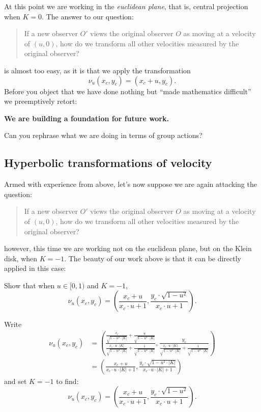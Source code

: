 \documentclass[12pt,noauthor,nooutcomes,handout,newpage]{ximera}
\begin{document}
At this point we are working in the \textit{euclidean plane}, that is,
central projection when $K=0$.
The answer to our question:
\begin{quote}
  If a new observer $O'$ views the original observer $O$ as moving at
  a velocity of $(u,0)$, how do we transform all other velocities
  measured by the original observer?
\end{quote}
is almost too easy, as it is that we apply the transformation
\[
\nu_u(x_c,y_c) = (x_c+u,y_c).
\]
Before you object that we have done nothing but ``made mathematics
difficult'' we preemptively retort:
\begin{center}
  \textbf{We are building a foundation for future work.}
\end{center}

\begin{problem}
  Can you rephrase what we are doing in terms of group actions?
\end{problem}




\subsection{Hyperbolic transformations of velocity}

Armed with experience from above, let's now suppose we are again attacking the question:
\begin{quote}
  If a new observer $O'$ views the original observer $O$ as moving at
  a velocity of $(u,0)$, how do we transform all other velocities
  measured by the original observer?
\end{quote}
however, this time we are working not on the euclidean plane, but on
the Klein disk, when $K=-1$. The beauty of our work above is that it
can be directly applied in this case:

\begin{problem}
  Show that when $u\in [0,1)$ and $K=-1$,
  \[
  \nu_u(x_c,y_c) = \left(\frac{x_c + u}{x_c\cdot u + 1},\frac{y_c\cdot \sqrt{1-u^2}}{x_c\cdot u+1}\right).
  \]
  \begin{freeResponse}
    Write
    \begin{align*}
    \nu_u(x_c,y_c)&=\left(\frac{\frac{x_c}{\sqrt{1-u^2\cdot|K|}} + \frac{u}{\sqrt{1-u^2\cdot|K|}}}
         {\frac{x_c\cdot u \cdot |K|}{\sqrt{1-u^2\cdot|K|}}+\frac{1}{\sqrt{1-u^2\cdot |K|}}},
         \frac{y_c}{\frac{x_c\cdot u \cdot |K|}{\sqrt{1-u^2\cdot|K|}}+\frac{1}{\sqrt{1-u^2\cdot |K|}}}\right)\\
         &=\left(\frac{x_c + u}{x_c\cdot u \cdot |K|+1},\frac{y_c\cdot \sqrt{1-u^2\cdot|K|}}{x_c\cdot u \cdot |K|+1}\right)
    \end{align*}
    and set $K=-1$ to find:
    \[
    \nu_u(x_c,y_c)=\left(\frac{x_c + u}{x_c\cdot u + 1},\frac{y_c\cdot \sqrt{1-u^2}}{x_c\cdot u+1}\right).
    \]
  \end{freeResponse}
\end{problem}
\end{document}
